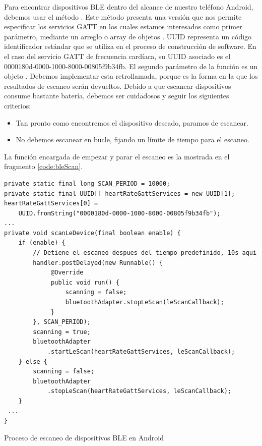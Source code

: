 Para encontrar dispositivos BLE dentro del alcance de nuestro teléfono Android, debemos usar el método . Este método presenta una versión que nos permite especificar los servicios GATT en los cuales estamos interesados como primer parámetro, mediante un arreglo o array de objetos . \ac{UUID} representa un código identificador estándar que se utiliza en el proceso de construcción de software. En el caso del servicio GATT de frecuencia cardíaca, su UUID asociado es el 0000180d-0000-1000-8000-00805f9b34fb. El segundo parámetro de la función es un objeto . Debemos implementar esta retrollamada, porque es la forma en la que los resultados de escaneo serán devueltos. Debido a que escanear dispositivos consume bastante batería, debemos ser cuidadosos y seguir los siguientes criterios:

\begin{itemize}
\item Tan pronto como encontremos el dispositivo deseado, paramos de escanear.
\item No debemos escanear en bucle, fijando un límite de tiempo para el escaneo.
\end{itemize}

La función encargada de empezar y parar el escaneo es la mostrada en el fragmento \ref{code:bleScan}.

\begin{listing}[h] 
\begin{verbatim}
private static final long SCAN_PERIOD = 10000; 
private static final UUID[] heartRateGattServices = new UUID[1];
heartRateGattServices[0] = 
    UUID.fromString("0000180d-0000-1000-8000-00805f9b34fb");
...
private void scanLeDevice(final boolean enable) {
    if (enable) {
        // Detiene el escaneo despues del tiempo predefinido, 10s aqui
        handler.postDelayed(new Runnable() {
             @Override
             public void run() {
                 scanning = false;
                 bluetoothAdapter.stopLeScan(leScanCallback);
             }
        }, SCAN_PERIOD);
        scanning = true;
        bluetoothAdapter
            .startLeScan(heartRateGattServices, leScanCallback);
    } else {
        scanning = false;
        bluetoothAdapter
            .stopLeScan(heartRateGattServices, leScanCallback);
    }
 ...
}
\end{verbatim}
\caption{Proceso de escaneo de dispositivos BLE en Android}
\label{code:bleScan}
\end{listing}

